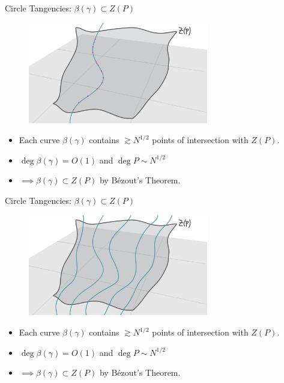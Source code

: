 \documentclass{beamer}
\newcommand{\nfr}[1]{\begin{frame} #1
\end{frame}}
\begin{document}
\nfr{{Circle Tangencies: $\beta(\gamma) \subset Z(P)$}
\begin{figure}[h]
    \centering
    \includegraphics[width=0.7\textwidth]{images/lots_of_dots_f.png}
\end{figure}
\begin{itemize}
    \item Each curve $\beta(\gamma)$ contains $\gtrsim N^{1/2}$ points of intersection with $Z(P)$. \pause
    \item $\deg \beta(\gamma) = O (1)$ and $\deg P \sim N^{1/2}$ \pause
    \item $\implies \beta(\gamma) \subset Z(P)$ by Bézout's Theorem.
\end{itemize}
}

\nfr{{Circle Tangencies: $\beta(\gamma) \subset Z(P)$}
\begin{figure}[h]
    \centering
    \includegraphics[width=0.7\textwidth]{images/lots_of_dots_g.png}
\end{figure}
\begin{itemize}
    \item Each curve $\beta(\gamma)$ contains $\gtrsim N^{1/2}$ points of intersection with $Z(P)$.
    \item $\deg \beta(\gamma) = O (1)$ and $\deg P \sim N^{1/2}$
    \item $\implies \beta(\gamma) \subset Z(P)$ by Bézout's Theorem.
\end{itemize}
}
\end{document}
